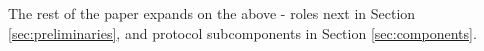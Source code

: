 
The rest of the paper expands on the above - roles next in Section \ref{sec:preliminaries}, and protocol subcomponents in Section \ref{sec:components}.
